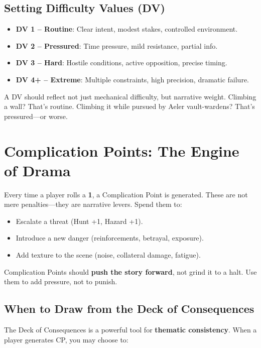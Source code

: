\subsection*{Setting Difficulty Values (DV)}

\begin{itemize}
    \item \textbf{DV 1 – Routine}: Clear intent, modest stakes, controlled environment.
    \item \textbf{DV 2 – Pressured}: Time pressure, mild resistance, partial info.
    \item \textbf{DV 3 – Hard}: Hostile conditions, active opposition, precise timing.
    \item \textbf{DV 4+ – Extreme}: Multiple constraints, high precision, dramatic failure.
\end{itemize}

A DV should reflect not just mechanical difficulty, but narrative weight. Climbing a wall? That’s routine. Climbing it while pursued by Aeler vault-wardens? That’s pressured—or worse.

\section*{Complication Points: The Engine of Drama}

Every time a player rolls a \textbf{1}, a Complication Point is generated. These are not mere penalties—they are narrative levers. Spend them to:

\begin{itemize}
    \item Escalate a threat (Hunt +1, Hazard +1).
    \item Introduce a new danger (reinforcements, betrayal, exposure).
    \item Add texture to the scene (noise, collateral damage, fatigue).
\end{itemize}

Complication Points should \textbf{push the story forward}, not grind it to a halt. Use them to add pressure, not to punish.

\subsection*{When to Draw from the Deck of Consequences}

The Deck of Consequences is a powerful tool for \textbf{thematic consistency}. When a player generates CP, you may choose to:

